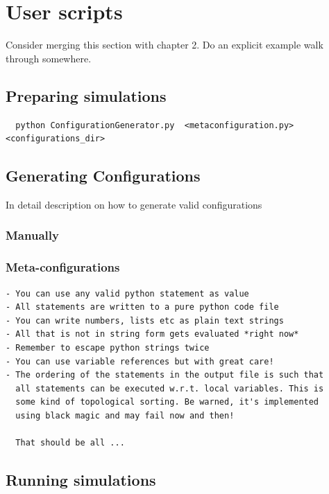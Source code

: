 \documentclass[a4paper,10pt]{report}
\begin{document}
\section{User scripts}

Consider merging this section with chapter 2.
Do an explicit example walk through somewhere.

\subsection{Preparing simulations}

\begin{verbatim}
  python ConfigurationGenerator.py  <metaconfiguration.py> <configurations_dir>
\end{verbatim}


\subsection{Generating Configurations}

In detail description on how to generate valid configurations

\subsubsection{Manually}

\subsubsection{Meta-configurations}

\begin{verbatim}
- You can use any valid python statement as value
- All statements are written to a pure python code file
- You can write numbers, lists etc as plain text strings
- All that is not in string form gets evaluated *right now*
- Remember to escape python strings twice
- You can use variable references but with great care!
- The ordering of the statements in the output file is such that
  all statements can be executed w.r.t. local variables. This is
  some kind of topological sorting. Be warned, it's implemented
  using black magic and may fail now and then!

  That should be all ...
\end{verbatim}

\subsection{Running simulations}
\end{document}
